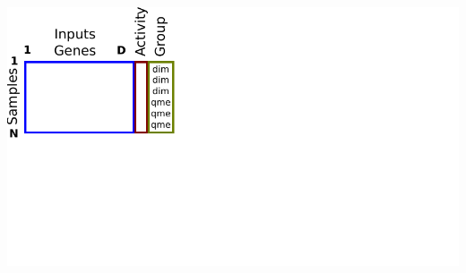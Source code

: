 \documentclass{beamer}
\begin{document}

\begin{frame}
  \includegraphics[width=\textwidth]{drawing-cv-same-other-1}
\end{frame}
\end{document}
